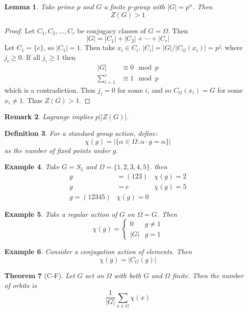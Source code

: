 \documentclass[a4paper,10pt]{article}
\newtheorem{thm}{Theorem}
\newtheorem{Def}[thm]{Definition}
\newtheorem{eg}[thm]{Example}
\newtheorem{Lem}[thm]{Lemma}
\newtheorem{rem}[thm]{Remark}
\begin{document}
\begin{Lem}
Take prime $p$ and $G$ a finite $p$-group with $|G| = p^n$. Then
\[ Z(G) > 1 \]
\end{Lem}

\begin{proof}
Let $C_1, C_2, \dots, C_r$ be conjugacy classes of $G = \Omega$. Then
\[ |G| = |C_1| + |C_2| + \cdots + |C_r| \]
Let $C_1 = \{e\}$, so $|C_1| = 1$. Then take $x_i \in C_i$. $|C_i| = |G| / |C_G(x_i)| = p^{j_i}$ where $j_i \geq 0$. If all $j_i \geq 1$ then
\begin{align*}
|G| &\cong 0 \mod p \\
\sum_{i = 1}^r &\cong 1 \mod p
\end{align*}
which is a contradiction. Thus $j_i = 0$ for some $i$, and so $C_G(x_i) = G$ for some $x_i \neq 1$. Thus $Z(G) > 1$.
\end{proof}

\begin{rem}
Lagrange implies $p \big| |Z(G)|$.
\end{rem}

\begin{Def}
For a standard group action, define:
\[ \chi(g) = | \{ \alpha \in \Omega : \alpha \cdot g = \alpha \} | \]
as the number of fixed points under $g$.
\end{Def}

\begin{eg}
Take $G = S_5$ and $\Omega = \{ 1,2,3,4,5\}$. then
\begin{align*}
g &= (123)             &\chi(g) = 2 \\
g &= e                &\chi(g) = 5 \\
g = (12345)            &\chi(g) = 0
\end{align*}

\end{eg}




\begin{eg}
Take a regular action of $G$ on $\Omega = G$. Then
\[ \chi(g) = \begin{cases} 0 & g \neq 1 \\ |G| & g = 1 \end{cases} \]
\end{eg}

\begin{eg}
Consider a conjugation action of elements. Then
\[ \chi(g) = |C_G(g)| \]
\end{eg}

\begin{thm}[C-F]
Let $G$ act on $\Omega$ with both $G$ and $\Omega$ finite. Then the number of orbits is
\[ \frac{1}{|G|} \sum_{x \in G} \chi(x) \]
\end{thm}
\end{document}
